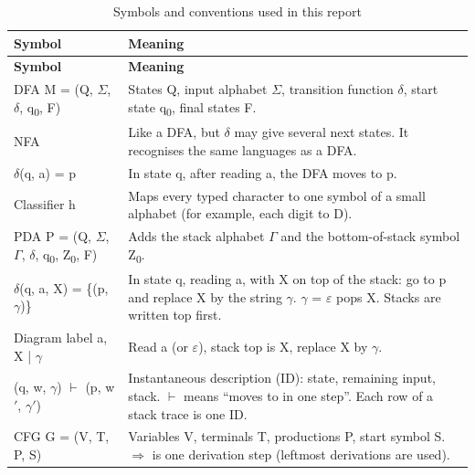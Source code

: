 \documentclass[12pt,a4paper]{article}
\begin{document}
{\small
\begin{longtable}{|>{\raggedright\arraybackslash}p{}|>{\raggedright\arraybackslash}p{}|}
\caption[Symbols and conventions used in this report]{Symbols and conventions used in this report}\label{tab:notation}\\
\hline
\rowcolor{hdr}\textbf{Symbol} & \textbf{Meaning}\\ \hline
\endfirsthead
\hline
\rowcolor{hdr}\textbf{Symbol} & \textbf{Meaning}\\ \hline
\endhead
DFA  M = (Q, \ensuremath{\Sigma}, \ensuremath{\delta}, q\textsubscript{0}, F) & States Q, input alphabet \ensuremath{\Sigma}, transition function \ensuremath{\delta}, start state q\textsubscript{0}, final states F.\\ \hline
NFA & Like a DFA, but \ensuremath{\delta} may give several next states. It recognises the same languages as a DFA.\\ \hline
\ensuremath{\delta}(q, a) = p & In state q, after reading a, the DFA moves to p.\\ \hline
Classifier h & Maps every typed character to one symbol of a small alphabet (for example, each digit to D).\\ \hline
PDA  P = (Q, \ensuremath{\Sigma}, \ensuremath{\Gamma}, \ensuremath{\delta}, q\textsubscript{0}, Z\textsubscript{0}, F) & Adds the stack alphabet \ensuremath{\Gamma} and the bottom-of-stack symbol Z\textsubscript{0}.\\ \hline
\ensuremath{\delta}(q, a, X) = \{(p, \ensuremath{\gamma})\} & In state q, reading a, with X on top of the stack: go to p and replace X by the string \ensuremath{\gamma}. \ensuremath{\gamma} = \ensuremath{\varepsilon} pops X. Stacks are written top first.\\ \hline
Diagram label  a, X | \ensuremath{\gamma} & Read a (or \ensuremath{\varepsilon}), stack top is X, replace X by \ensuremath{\gamma}.\\ \hline
(q, w, \ensuremath{\gamma}) \ensuremath{\vdash} (p, w\ensuremath{'}, \ensuremath{\gamma}\ensuremath{'}) & Instantaneous description (ID): state, remaining input, stack. \ensuremath{\vdash} means ``moves to in one step''. Each row of a stack trace is one ID.\\ \hline
CFG  G = (V, T, P, S) & Variables V, terminals T, productions P, start symbol S. \ensuremath{\Rightarrow} is one derivation step (leftmost derivations are used).\\ \hline

\end{longtable}}
\end{document}
